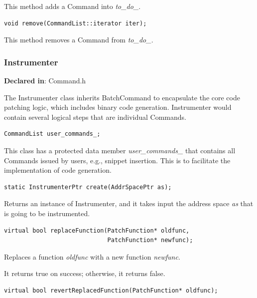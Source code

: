 \documentclass[11pt]{article}
\begin{document}
This method adds a Command into \emph{to\_do\_}.


\begin{verbatim}
void remove(CommandList::iterator iter);

\end{verbatim}



This method removes a Command from \emph{to\_do\_}.

\subsubsection{Instrumenter}
\label{sec-3.2.5}

\textbf{Declared in}: Command.h

The Instrumenter class inherits BatchCommand to encapsulate the core code
patching logic, which includes binary code generation. Instrumenter would
contain several logical steps that are individual Commands.


\begin{verbatim}
CommandList user_commands_;

\end{verbatim}



This class has a protected data member \emph{user\_commands\_} that contains all
Commands issued by users, e.g., snippet insertion. This is to facilitate the
implementation of code generation.


\begin{verbatim}
static InstrumenterPtr create(AddrSpacePtr as);

\end{verbatim}



Returns an instance of Instrumenter, and it takes input the address space \emph{as}
that is going to be instrumented.


\begin{verbatim}
virtual bool replaceFunction(PatchFunction* oldfunc,
                             PatchFunction* newfunc);

\end{verbatim}



Replaces a function \emph{oldfunc} with a new function \emph{newfunc}.

It returns true on success; otherwise, it returns false.


\begin{verbatim}
virtual bool revertReplacedFunction(PatchFunction* oldfunc);

\end{verbatim}
\end{document}
